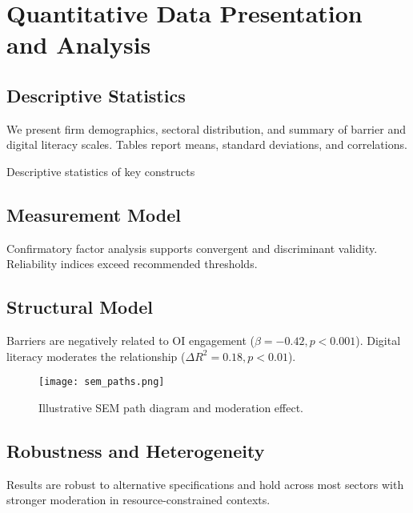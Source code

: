 \chapter{Quantitative Data Presentation and Analysis}\label{ch:quant}

\section{Descriptive Statistics}
We present firm demographics, sectoral distribution, and summary of barrier and digital literacy scales. Tables report means, standard deviations, and correlations.

\begin{table}[H]
  \centering
  \caption{Descriptive statistics of key constructs}
  \label{tab:descriptives}
  
\end{table}

\section{Measurement Model}
Confirmatory factor analysis supports convergent and discriminant validity. Reliability indices exceed recommended thresholds.

\section{Structural Model}
Barriers are negatively related to OI engagement (\(\beta = -0.42, p<0.001\)). Digital literacy moderates the relationship (\(\Delta R^{2} = 0.18, p<0.01\)).

\begin{figure}[H]
  \centering
  \texttt{[image: sem\_paths.png]}
  \caption{Illustrative SEM path diagram and moderation effect.}
  \label{fig:sem}
\end{figure}

\section{Robustness and Heterogeneity}
Results are robust to alternative specifications and hold across most sectors with stronger moderation in resource-constrained contexts.
